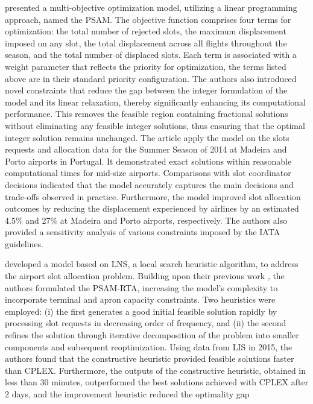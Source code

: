  presented a multi-objective optimization
model, utilizing a linear programming approach, named the \acrfull{PSAM}.
%
The objective function comprises four terms for optimization: the total number
of rejected slots, the maximum displacement imposed on any slot, the total
displacement across all flights throughout the season, and the total number of
displaced slots.
%
Each term is associated with a weight parameter that reflects the priority for
optimization, the terms listed above are in their standard priority
configuration.
%
The authors also introduced novel constraints that reduce the gap between the
integer formulation of the model and its linear relaxation, thereby
significantly enhancing its computational performance.
%
This removes the feasible region containing fractional solutions without
eliminating any feasible integer solutions, thus ensuring that the optimal
integer solution remains unchanged.
%
The article apply the model on the slots requests and allocation data for the
Summer Season of 2014 at Madeira and Porto airports in Portugal.
%
It demonstrated exact solutions within reasonable computational times for
mid-size airports.
%
Comparisons with slot coordinator decisions indicated that the model accurately
captures the main decisions and trade-offs observed in practice.
%
Furthermore, the model improved slot allocation outcomes by reducing the
displacement experienced by airlines by an estimated 4.5\% and 27\% at Madeira
and Porto airports, respectively.
%
The authors also provided a sensitivity analysis of various constraints imposed
by the IATA guidelines.



 developed a model based on \acrfull{LNS},
a local search heuristic algorithm, to address the airport slot allocation
problem.
%
Building upon their previous work \cite{ribeiro2018optimization}, the authors
formulated the \acrfull{PSAM-RTA}, increasing the model's complexity to
incorporate terminal and apron capacity constraints.
%
Two heuristics were employed: (i) the first generates a good initial feasible
solution rapidly by processing slot requests in decreasing order of frequency,
and (ii) the second refines the solution through iterative decomposition of the
problem into smaller components and subsequent reoptimization.
%
Using data from \acrfull{LIS} in 2015, the authors found that the constructive
heuristic provided feasible solutions faster than CPLEX.
%
Furthermore, the outputs of the constructive heuristic, obtained in less than 30
minutes, outperformed the best solutions achieved with CPLEX after 2 days, and
the improvement heuristic reduced the optimality gap




